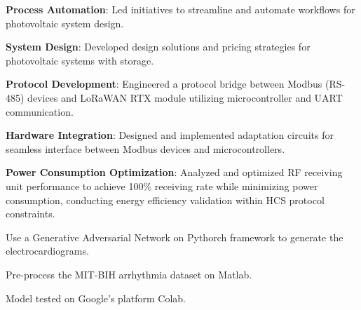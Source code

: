 \documentclass{dske-resume-openfont}
\begin{document}
\begin{minipage}[t]{0.62\textwidth}
\vspace{\topsep} %
\begin{tightemize}
\item \textbf{Process Automation}: Led initiatives to streamline and automate workflows for photovoltaic system design.
\item \textbf{System Design}: Developed design solutions and pricing strategies for photovoltaic systems with storage.
\end{tightemize}

\sectionsep{}
\vspace{\topsep}
\begin{tightemize}
\item \textbf{Protocol Development}: Engineered a protocol bridge between Modbus (RS-485) devices and LoRaWAN RTX module utilizing microcontroller and UART communication.
\item \textbf{Hardware Integration}: Designed and implemented adaptation circuits for seamless interface between Modbus devices and microcontrollers.
\item \textbf{Power Consumption Optimization}: Analyzed and optimized RF receiving unit performance to achieve 100\% receiving rate while minimizing power consumption, conducting energy efficiency validation within HCS protocol constraints.
\end{tightemize}

\sectionsep{}



\vspace{\topsep} %
\begin{tightemize}
\item Use a Generative Adversarial Network on Pythorch framework to generate the electrocardiograms.
\item Pre-process the MIT-BIH arrhythmia dataset on Matlab.
\item Model tested on Google's platform Colab.
\end{tightemize}

\end{minipage} 
\end{document}
